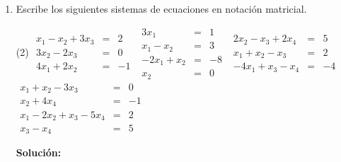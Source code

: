 \documentclass[12pt]{article}
\newenvironment{solucion}
{\begin{mdframed}[backgroundcolor=black!10]
		{\bf Solución:}\\
	}
	{
	\end{mdframed}
}
\newenvironment{preguntas}
{\begin{enumerate}\itemsep12pt
	}
	{
	\end{enumerate}
}
\begin{document}
\begin{preguntas}
\begin{solucion}
\begin{enumerate}[a)]
$$\begin{array}{r}
\end{array}\right) = 0$$
\item Para demostrar esto, debemos demostrar que
$$(b-proy_a b) \cdot a = 0 $$
Desarrollando,
$$\left(b-\dfrac{b \cdot a}{|a|^2}a\right) \cdot a = 0 $$
$$b \cdot a -\dfrac{b \cdot a}{|a|^2}a \cdot a = 0 $$
$$b \cdot a -\dfrac{b \cdot a}{|a|^2}|a|^2 = 0 $$
$$b \cdot a -b \cdot a = 0 $$
$$0 = 0$$
$$\blacksquare$$
\end{enumerate}
\end{solucion}
\item Escribe los siguientes sistemas de ecuaciones en notación matricial.
\begin{tasks}(2)
\task $
		\begin{array}{rcr}
		x_1 -x_2 + 3x_3 & = & 2\\
		3x_2 - 2x_3 & = & 0\\
		4x_1 +2x_2 & = & -1
		\end{array}
		$
\task $
		\begin{array}{rcr}
		3x_1 & = & 1\\
		x_1-x_2& = & 3\\
		-2x_1+x_2 & = & -8\\
		x_2 & = & 0
		\end{array}
		$
\task $
		\begin{array}{rcr}
		2x_2 -x_3 +2x_4& = & 5\\
		x_1+x_2 - x_3 & = & 2\\
		-4x_1 +x_3-x_4& = & -4
		\end{array}
		$
\task $
		\begin{array}{rcr}
		x_1 +x_2-3x_3& = & 0\\
		x_2+4x_4& = & -1\\
		x_1-2x_2+x_3-5x_4 & = & 2\\
		x_3-x_4 & = & 5
		\end{array}
		$
\end{tasks}
\begin{solucion}


\end{solucion}
\end{preguntas}
\end{document}
